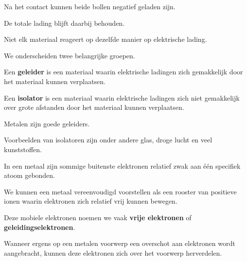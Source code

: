 \documentclass{ximera}
\begin{document}
Na het contact kunnen beide bollen negatief geladen zijn.

De totale lading blijft daarbij behouden.




Niet elk materiaal reageert op dezelfde manier op elektrische lading.

We onderscheiden twee belangrijke groepen.


\begin{definitie}[Geleider]

Een \textbf{geleider} is een materiaal waarin elektrische ladingen zich
gemakkelijk door het materiaal kunnen verplaatsen.

\end{definitie}


\begin{definitie}[Isolator]

Een \textbf{isolator} is een materiaal waarin elektrische ladingen zich
niet gemakkelijk over grote afstanden door het materiaal kunnen
verplaatsen.

\end{definitie}


Metalen zijn goede geleiders.

Voorbeelden van isolatoren zijn onder andere glas, droge lucht en veel
kunststoffen.




In een metaal zijn sommige buitenste elektronen relatief zwak aan één
specifiek atoom gebonden.

We kunnen een metaal vereenvoudigd voorstellen als een rooster van
positieve ionen waarin elektronen zich relatief vrij kunnen bewegen.

Deze mobiele elektronen noemen we vaak \textbf{vrije elektronen} of
\textbf{geleidingselektronen}.

Wanneer ergens op een metalen voorwerp een overschot aan elektronen
wordt aangebracht, kunnen deze elektronen zich over het voorwerp
herverdelen.
\end{document}
